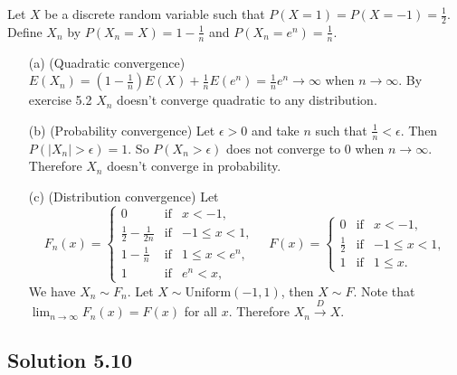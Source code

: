 Let $X$ be a discrete random variable such that $P(X = 1) = P(X = -1) = \frac{1}{2}$.
Define $X_n$ by $P(X_n = X) = 1 - \frac{1}{n}$ and $P(X_n = e^n) = \frac{1}{n}$.
\begin{itemize}
    \item[(a)] (Quadratic convergence)
        $E(X_n) = (1 - \frac{1}{n}) E(X) + \frac{1}{n} E(e^n) = \frac{1}{n}e^n \to \infty$ when $n \to \infty$.
        By exercise 5.2 $X_n$ doesn't converge quadratic to any distribution.
    \item[(b)] (Probability convergence)
        Let $\epsilon > 0$ and take $n$ such that $\frac{1}{n} < \epsilon$.
        Then $P(|X_n| > \epsilon) = 1$.
        So $P(X_n > \epsilon)$ does not converge to $0$ when $n \to \infty$.
        Therefore $X_n$ doesn't converge in probability.
    \item[(c)] (Distribution convergence)
        Let
        \begin{equation*}
            F_n(x) = \left\{ \begin{array}{lll}
                0 & \textrm{if} & x < -1, \\
                \frac{1}{2} - \frac{1}{2n} & \textrm{if} & -1 \leq x < 1, \\
                1 - \frac{1}{n} & \textrm{if} & 1 \leq x < e^n, \\
                1 & \textrm{if} & e^n < x,
            \end{array} \right.
            \quad
            F(x) = \left\{ \begin{array}{lll}
                0 & \textrm{if} & x < -1, \\
                \frac{1}{2} & \textrm{if} & -1 \leq x < 1, \\
                1 & \textrm{if} & 1 \leq x.
            \end{array} \right.
        \end{equation*}
        We have $X_n \sim F_n$.
        Let $X \sim \mathrm{Uniform}(-1, 1)$, then $X \sim F$.
        Note that $\lim_{n \to \infty} F_n(x) = F(x)$ for all $x$.
        Therefore $X_n \xrightarrow{D} X$.
\end{itemize}


\subsection*{Solution 5.10}

